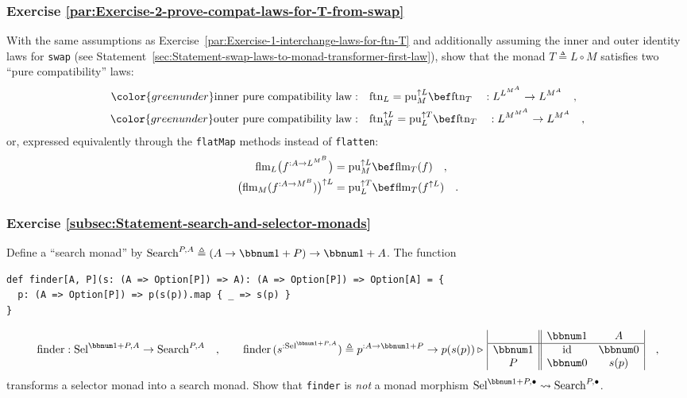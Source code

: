 \subsubsection{Exercise \label{par:Exercise-2-prove-compat-laws-for-T-from-swap}\ref{par:Exercise-2-prove-compat-laws-for-T-from-swap}}

With the same assumptions as Exercise~\ref{par:Exercise-1-interchange-laws-for-ftn-T}
and additionally assuming the inner and outer identity laws for \lstinline!swap!
(see Statement~\ref{sec:Statement-swap-laws-to-monad-transformer-first-law}),
show that the monad $T\triangleq L\circ M$ satisfies two \textsf{``}pure
compatibility\textsf{''} laws:
\begin{align*}
{\color{greenunder}\text{inner pure compatibility law}:}\quad & \text{ftn}_{L}=\text{pu}_{M}^{\uparrow L}\bef\text{ftn}_{T}\quad:L^{L^{M^{A}}}\rightarrow L^{M^{A}}\quad,\\
{\color{greenunder}\text{outer pure compatibility law}:}\quad & \text{ftn}_{M}^{\uparrow L}=\text{pu}_{L}^{\uparrow T}\bef\text{ftn}_{T}\quad:L^{M^{M^{A}}}\rightarrow L^{M^{A}}\quad,
\end{align*}
or, expressed equivalently through the \lstinline!flatMap! methods
instead of \lstinline!flatten!:
\begin{align*}
\text{flm}_{L}\big(f^{:A\rightarrow L^{M^{B}}}\big) & =\text{pu}_{M}^{\uparrow L}\bef\text{flm}_{T}(f)\quad,\\
\big(\text{flm}_{M}(f^{:A\rightarrow M^{B}})\big)^{\uparrow L} & =\text{pu}_{L}^{\uparrow T}\bef\text{flm}_{T}(f^{\uparrow L})\quad.
\end{align*}


\subsubsection{Exercise \label{subsec:Statement-search-and-selector-monads}\ref{subsec:Statement-search-and-selector-monads}}

Define a \textsf{``}search monad\textsf{''} by $\text{Search}^{P,A}\triangleq\left(A\rightarrow\bbnum 1+P\right)\rightarrow\bbnum 1+A$.
The function 
\begin{lstlisting}
def finder[A, P](s: (A => Option[P]) => A): (A => Option[P]) => Option[A] = {
  p: (A => Option[P]) => p(s(p)).map { _ => s(p) }
}
\end{lstlisting}
\[
\text{finder}:\text{Sel}^{\bbnum 1+P,A}\rightarrow\text{Search}^{P,A}\quad,\quad\quad\text{finder}\,(s^{:\text{Sel}^{\bbnum 1+P,A}})\triangleq p^{:A\rightarrow\bbnum 1+P}\rightarrow p(s(p))\triangleright\,\begin{array}{|c||cc|}
 & \bbnum 1 & A\\
\hline \bbnum 1 & \text{id} & \bbnum 0\\
P & \bbnum 0 & s(p)
\end{array}\quad,
\]
transforms a selector monad into a search monad. Show that \lstinline!finder!
is \emph{not} a monad morphism $\text{Sel}^{\bbnum 1+P,\bullet}\leadsto\text{Search}^{P,\bullet}$.

